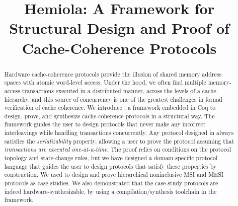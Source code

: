 \documentclass[sigplan,10pt,review,anonymous,screen]{acmart}\settopmatter{printfolios=true,printccs=false,printacmref=false}
\begin{document}
\title{Hemiola: A Framework for Structural Design and Proof of Cache-Coherence Protocols}


\begin{abstract}
  Hardware cache-coherence protocols provide the illusion of shared memory address spaces with atomic word-level access.
  Under the hood, we often find multiple memory-access transactions executed in a distributed manner, across the levels of a cache hierarchy, and this source of concurrency is one of the greatest challenges in formal verification of cache coherence.
  We introduce \hemiola{}, a framework embedded in Coq to design, prove, and synthesize cache-coherence protocols in a structural way.
  The framework guides the user to design protocols that never make any incorrect interleavings while handling transactions concurrently.
  Any protocol designed in \hemiola{} always satisfies the \emph{serializability} property, allowing a user to prove the protocol assuming that \emph{transactions are executed one-at-a-time}.
  The proof relies on conditions on the protocol topology and state-change rules, but we have designed a domain-specific protocol language that guides the user to design protocols that satisfy these properties by construction.
  We used \hemiola{} to design and prove hierarchical noninclusive MSI and MESI protocols as case studies.
  We also demonstrated that the case-study protocols are indeed hardware-synthesizable, by using a compilation/synthesis toolchain in the framework.
\end{abstract}


\newcommand{\todo}[1]{\emph{\textcolor{red}{TODO: #1}}}
\newcommand{\note}[1]{\emph{\textcolor{blue}{NOTE: #1}}}
\newcommand{\panic}[1]{\textbf{\textcolor{red}{(#1)}}}

\renewcommand{\subsectionautorefname}{section}
\renewcommand{\subsubsectionautorefname}{section}
\newcommand{\definitionautorefname}{definition}

\newcommand{\ie}{i.e.,}
\newcommand{\eg}{e.g.,}
\newcommand{\aka}{a.k.a.}

\newcommand{\tuple}[1]{\langle #1 \rangle}
\renewcommand\qedsymbol{$\blacksquare$}
\end{document}
